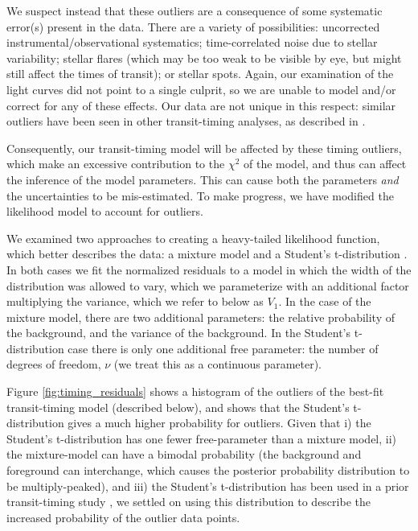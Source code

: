 \documentclass[twocolumn]{aastex63}
\begin{document}
We suspect instead that these outliers
are a consequence of some systematic error(s) present in the data.  There are a variety
of possibilities:  uncorrected instrumental/observational systematics;
time-correlated noise due to stellar variability;  stellar flares (which
may be too weak to be visible by eye, but might still affect the
times of transit); or stellar spots.  Again, our examination of
the light curves did not point to a single culprit, so we are unable
to model and/or correct for any of these effects.  Our data are not unique in this respect:  similar outliers
have been seen in other transit-timing analyses, as described
in \citet{JontofHutter2016}.

Consequently, our transit-timing model will be affected by these
timing outliers, which make an excessive contribution to the
$\chi^2$ of the model, and thus can affect the inference of
the model parameters.   This can cause both the parameters {\it and}
the uncertainties to be mis-estimated.  To make progress, we have
modified the likelihood model to account for outliers.

We examined two approaches to creating a heavy-tailed likelihood function, which
better describes the data:  a mixture model \citep{Hogg2010,ForemanMackey2014} and
a Student's t-distribution \citep{JontofHutter2016}.   In both cases
we fit the normalized residuals to a model
in which the width of the distribution was
allowed to vary, which we parameterize with
an additional factor multiplying the variance, which we refer to below as $V_1$.  In the case of the mixture
model, there are two additional parameters:
the relative probability of the background, and
the variance of the background.  In the Student's t-distribution case there is only one
additional free parameter:  the number of
degrees of freedom, $\nu$ (we treat this as a continuous parameter).

Figure \ref{fig:timing_residuals} shows a histogram of the outliers of the best-fit transit-timing model (described below),
and shows that %
the Student's t-distribution gives a much higher probability
for outliers. %
Given that
i) the Student's t-distribution has one fewer free-parameter than a mixture model, ii)  the
mixture-model can have a  bimodal probability (the background and foreground can interchange,
which causes the posterior probability distribution to be multiply-peaked),
and iii)  the Student's t-distribution has been used in a prior transit-timing study \citep{JontofHutter2016},
we settled on using this distribution to describe the increased probability
of the outlier data points.
\end{document}
